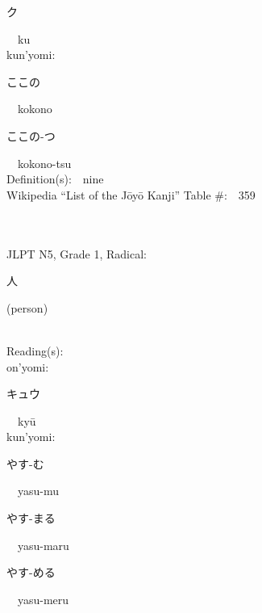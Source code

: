 \begin{multicols}{2}
{\hspace*{2em}}{\begin{CJK}{UTF8}{min} ク \end{CJK}}\ \ ku\ \ \\
{\hspace*{1em}}kun'yomi:\ \ \\
{\hspace*{2em}}{\begin{CJK}{UTF8}{min} ここの \end{CJK}}\ \ kokono\ \ \\
{\hspace*{2em}}{\begin{CJK}{UTF8}{min} ここの-つ \end{CJK}}\ \ kokono-tsu\ \ \\
Definition(s):\ \ nine \\
Wikipedia ``List of the J\=oy\=o Kanji'' Table \#:\ \ 359 \\
\ \ \\
{\fontsize{34pt}{40pt}  }\ \ \\  %
{JLPT N5, Grade 1, Radical:\ \ {\begin{CJK}{UTF8}{min} 人 \end{CJK}} (person) } \\
Reading(s):\ \ \\
{\hspace*{1em}}on'yomi:\ \ \\
{\hspace*{2em}}{\begin{CJK}{UTF8}{min} キュウ \end{CJK}}\ \ ky\=u\ \ \\
{\hspace*{1em}}kun'yomi:\ \ \\
{\hspace*{2em}}{\begin{CJK}{UTF8}{min} やす-む \end{CJK}}\ \ yasu-mu\ \ \\
{\hspace*{2em}}{\begin{CJK}{UTF8}{min} やす-まる \end{CJK}}\ \ yasu-maru\ \ \\
{\hspace*{2em}}{\begin{CJK}{UTF8}{min} やす-める \end{CJK}}\ \ yasu-meru\ \ \\

\end{multicols}
